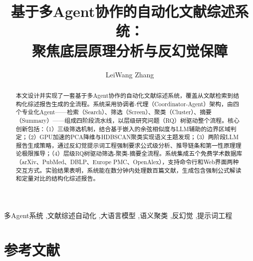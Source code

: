 \documentclass[preprint,12pt,authoryear]{elsarticle}
\begin{document}
\begin{frontmatter}

\title{基于多Agent协作的自动化文献综述系统：\\聚焦底层原理分析与反幻觉保障}

\author[label1]{LeiWang Zhang}

\begin{abstract}
本文设计并实现了一套基于多Agent协作的自动化文献综述系统，覆盖从文献检索到结构化综述报告生成的全流程。系统采用协调者-代理（Coordinator-Agent）架构，由四个专业化Agent——检索（Search）、筛选（Screen）、聚类（Cluster）、摘要（Summary）——组成四阶段流水线，以层级研究问题（RQ）树驱动整个流程。核心创新包括：（1）三级筛选机制，结合基于嵌入的余弦相似度与LLM辅助的边界区域判定；（2）GPU加速的PCA降维与HDBSCAN聚类实现语义主题发现；（3）两阶段LLM报告生成策略，通过反幻觉提示词工程强制要求公式级分析、推导链条和第一性原理理论极限推导；（4）层级RQ树驱动筛选-聚类-摘要全流程。系统集成五个免费学术数据库（arXiv、PubMed、DBLP、Europe PMC、OpenAlex），支持命令行和Web界面两种交互方式。实验结果表明，系统能在数分钟内处理数百篇文献，生成包含强制公式解读和定量对比的结构化综述报告。
\end{abstract}

\begin{keyword}
多Agent系统 \sep 文献综述自动化 \sep 大语言模型 \sep 语义聚类 \sep 反幻觉 \sep 提示词工程
\end{keyword}

\end{frontmatter}









\section*{参考文献}


\end{document}
